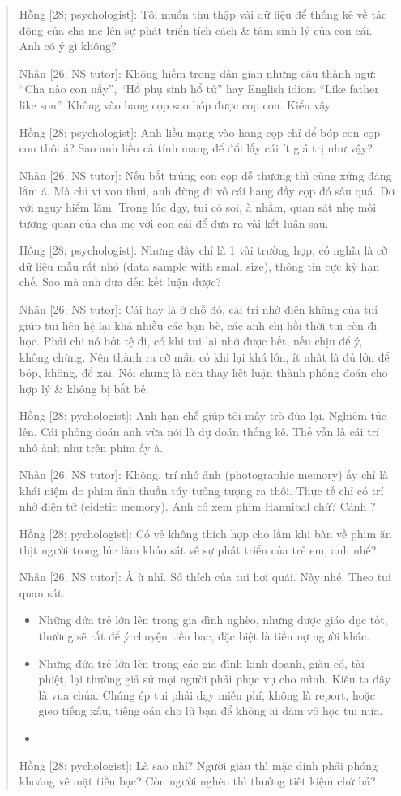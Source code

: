 \documentclass[12pt,twoside]{book}
\begin{document}
\begin{quote}
	{\sf Hồng [28; psychologist]}: Tôi muốn thu thập vài dữ liệu để thống kê về tác động của cha mẹ lên sự phát triển tích cách \& tâm sinh lý của con cái. Anh có ý gì không?

	{\sf Nhân [26; NS tutor]}: Không hiếm trong dân gian những câu thành ngữ: ``Cha nào con nấy'', ``Hổ phụ sinh hổ tử'' hay English idiom ``Like father like son''. Không vào hang cọp sao bóp được cọp con. Kiểu vậy.
	
	{\sf Hồng [28; psychologist]}: Anh liều mạng vào hang cọp chỉ để bóp con cọp con thôi á? Sao anh liều cả tính mạng để đổi lấy cái ít giá trị như vậy?
	
	{\sf Nhân [26; NS tutor]}: Nếu bắt trúng con cọp dễ thương thì cũng xứng đáng lắm á. Mà chỉ ví von thui, anh đừng đi vô cái hang đầy cọp đó sâu quá. Dơ với nguy hiểm lắm. Trong lúc dạy, tui có soi, à nhầm, quan sát nhẹ mối tương quan của cha mẹ với con cái để đưa ra vài kết luận sau.
	
	{\sf Hồng [28; psychologist]}: Nhưng đấy chỉ là 1 vài trường hợp, có nghĩa là cỡ dữ liệu mẫu rất nhỏ (data sample with small size), thông tin cực kỳ hạn chế. Sao mà anh đưa đến kết luận được?
	
	{\sf Nhân [26; NS tutor]}: Cái hay là ở chỗ đó, cái trí nhớ điên khùng của tui giúp tui liên hệ lại khá nhiều các bạn bè, các anh chị hồi thời tui còn đi học. Phải chi nó bớt tệ đi, có khi tui lại nhớ được hết, nếu chịu để ý, không chừng. Nên thành ra cỡ mẫu có khi lại khá lớn, ít nhất là đủ lớn để bóp, không, để xài. Nói chung là nên thay kết luận thành phỏng đoán cho hợp lý \& không bị bắt bẻ.
	
	{\sf Hồng [28; pychologist]}: Anh hạn chế giúp tôi mấy trò đùa lại. Nghiêm túc lên. Cái phỏng đoán anh vừa nói là dự đoán thống kê. Thế vẫn là cái trí nhớ ảnh như trên phim ấy à.
	
	{\sf Nhân [26; NS tutor]}: Không, trí nhớ ảnh (photographic memory) ấy chỉ là khái niệm do phim ảnh thuần túy tưởng tượng ra thôi. Thực tế chỉ có trí nhớ điện tử (eidetic memory). Anh có xem phim Hannibal chứ? Cảnh ?
	
	{\sf Hồng [28; pychologist]}: Có vẻ không thích hợp cho lắm khi bàn về phim ăn thịt người trong lúc làm khảo sát về sự phát triển của trẻ em, anh nhể?
	
	{\sf Nhân [26; NS tutor]}: À ừ nhỉ. Sở thích của tui hơi quái. Này nhé. Theo tui quan sát.
	\begin{itemize}
		\item Những đứa trẻ lớn lên trong gia đình nghèo, nhưng được giáo dục tốt, thường sẽ rất để ý chuyện tiền bạc, đặc biệt là tiền nợ người khác.
		\item Những đứa trẻ lớn lên trong các gia đình kinh doanh, giàu có, tài phiệt, lại thường giả sử mọi người phải phục vụ cho mình. Kiểu ta đây là vua chúa. Chúng ép tui phải dạy miễn phí, không là report, hoặc gieo tiếng xấu, tiếng oán cho lũ bạn để không ai dám vô học tui nữa.
		\item 
	\end{itemize}
	{\sf Hồng [28; pychologist]}: Là sao nhỉ? Người giàu thì mặc định phải phóng khoáng về mặt tiền bạc? Còn người nghèo thì thường tiết kiệm chứ hả?
	

\end{quote}
\end{document}
